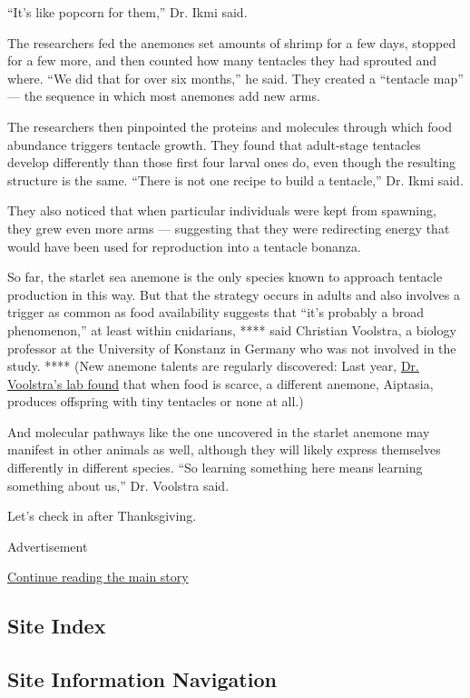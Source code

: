 ``It's like popcorn for them,'' Dr. Ikmi said.

The researchers fed the anemones set amounts of shrimp for a few days,
stopped for a few more, and then counted how many tentacles they had
sprouted and where. ``We did that for over six months,'' he said. They
created a ``tentacle map'' --- the sequence in which most anemones add
new arms.

The researchers then pinpointed the proteins and molecules through which
food abundance triggers tentacle growth. They found that adult-stage
tentacles develop differently than those first four larval ones do, even
though the resulting structure is the same. ``There is not one recipe to
build a tentacle,'' Dr. Ikmi said.

They also noticed that when particular individuals were kept from
spawning, they grew even more arms --- suggesting that they were
redirecting energy that would have been used for reproduction into a
tentacle bonanza.

So far, the starlet sea anemone is the only species known to approach
tentacle production in this way. But that the strategy occurs in adults
and also involves a trigger as common as food availability suggests that
``it's probably a broad phenomenon,'' at least within cnidarians, ****
said Christian Voolstra, a biology professor at the University of
Konstanz in Germany who was not involved in the study. **** (New anemone
talents are regularly discovered: Last year,
\href{https://link.springer.com/article/10.1007/s13199-019-00603-9}{Dr.
Voolstra's lab found} that when food is scarce, a different anemone,
Aiptasia, produces offspring with tiny tentacles or none at all.)

And molecular pathways like the one uncovered in the starlet anemone may
manifest in other animals as well, although they will likely express
themselves differently in different species. ``So learning something
here means learning something about us,'' Dr. Voolstra said.

Let's check in after Thanksgiving.

Advertisement

\protect\hyperlink{after-bottom}{Continue reading the main story}

\hypertarget{site-index}{%
\subsection{Site Index}\label{site-index}}

\hypertarget{site-information-navigation}{%
\subsection{Site Information
Navigation}\label{site-information-navigation}}

